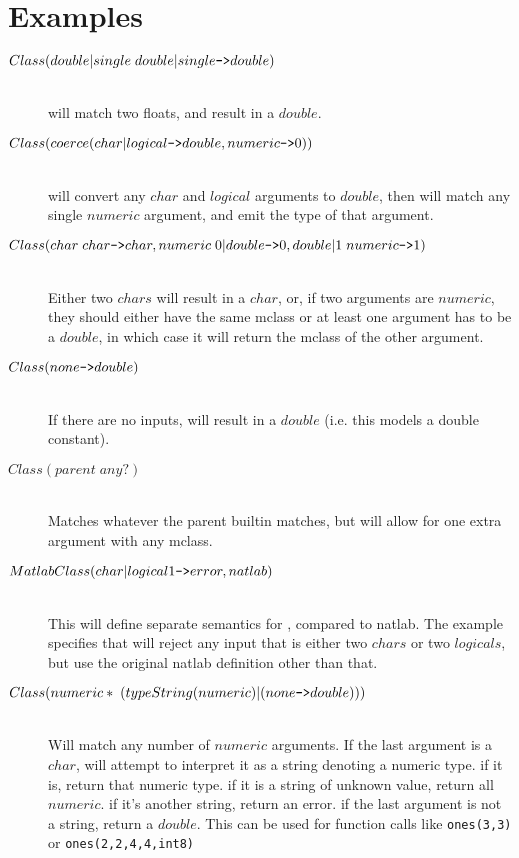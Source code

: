 \section{ Examples }
\begin{description}
\item[$Class(double|single \phantom{.} double|single\text{{\tt ->}}double)$] \hfill \\
  will match two floats, and result in a $double$.


\item[$Class(coerce(char|logical\text{{\tt ->}}double, numeric\text{{\tt ->}}0))$] \hfill\\
  will convert any $char$ and $logical$ arguments to $double$, then will
  match any single $numeric$ argument, and emit the type of that argument.

\item[$Class(char \phantom{.} char\text{{\tt ->}}char, numeric \phantom{.} 0|double\text{{\tt ->}}0,  double|1 \phantom{.} numeric\text{{\tt ->}}1)$] \hfill\\
  Either two $chars$ will result in a $char$, or, if two arguments are
  $numeric$, they should either have the same mclass or at least one
  argument has to be a $double$, in which case it will return the mclass
  of the other argument.

\item[$Class(none\text{{\tt ->}}double)$] \hfill\\
  If there are no inputs, will result in a $double$ (i.e. this models a
  double constant).

\item[$Class(parent \phantom{.} any?)$] \hfill\\
  Matches whatever the parent builtin matches, but will allow for one
  extra argument with any mclass.

\item[$MatlabClass(char|logical 1\text{{\tt ->}}error, natlab)$] \hfill\\
  This will define separate semantics for \matlab, compared to natlab.
  The example specifies that \matlab will reject any input that is either two
  $chars$ or two $logicals$, but use the original natlab definition other
  than that.

\item[$Class(numeric* \phantom{.} (typeString(numeric)|(none\text{{\tt ->}}double)))$] \hfill\\
  Will match any number of $numeric$ arguments. If the last argument
  is a $char$, will attempt to interpret it as a string denoting a
  numeric type. if it is, return that numeric type. if it is a string
  of unknown value, return all $numeric$. if it's another string, return
  an error. if the last argument is not a string, return a $double$.
  This can be used for function calls like
       {\tt ones(3,3)} or 
       {\tt ones(2,2,4,4,\textquotesingle int8\textquotesingle)}
\end{description}

